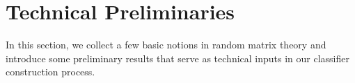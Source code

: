 \documentclass[12pt]{article}
\numberwithin{equation}{section}
\theoremstyle{remark}
\newcommand{\1}{{\rm 1}\kern-0.24em{\rm I}}
\begin{document}







\section{Technical Preliminaries} \label{sec:Pre}


In this section, we collect a few basic notions in random matrix theory and introduce some preliminary results that serve as technical inputs in our classifier construction process. %



\end{document}
